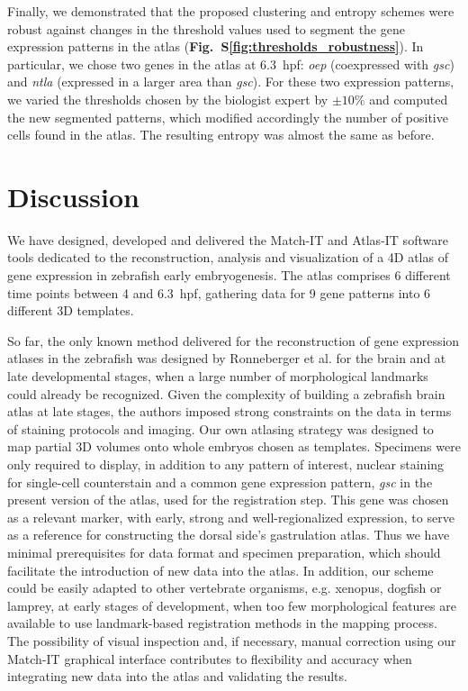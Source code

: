 Finally, we demonstrated that the proposed clustering and entropy schemes were robust against changes in the threshold values used to segment the gene expression patterns in the atlas (\textbf{Fig.~S\ref{fig:thresholds_robustness}}). In particular, we chose two genes in the atlas at 6.3~hpf: \emph{oep} (coexpressed with \emph{gsc}) and \emph{ntla} (expressed in a larger area than \emph{gsc}). For these two expression patterns, we varied the thresholds chosen by the biologist expert by $\pm10\%$ and computed the new segmented patterns, which modified accordingly the number of positive cells found in the atlas. The resulting entropy was almost the same as before.

\section*{Discussion}

We have designed, developed and delivered the Match-IT and Atlas-IT software tools dedicated to the reconstruction, analysis and visualization of a 4D atlas of gene expression in zebrafish early embryogenesis. The atlas comprises 6 different time points between 4 and 6.3~hpf, gathering data for 9 gene patterns into 6 different 3D templates.

So far, the only known method delivered for the reconstruction of gene expression atlases in the zebrafish was designed by Ronneberger et al.\cite{ronneberger2012vibe} for the brain and at late developmental stages, when a large number of morphological landmarks could already be recognized. Given the complexity of building a zebrafish brain atlas at late stages, the authors imposed strong constraints on the data in terms of staining protocols and imaging. Our own atlasing strategy was designed to map partial 3D volumes onto whole embryos chosen as templates.  Specimens were only required to display, in addition to any pattern of interest, nuclear staining for single-cell counterstain and a common gene expression pattern, \emph{gsc} in the present version of the atlas, used for the registration step. This gene was chosen as a relevant marker, with early, strong and well-regionalized expression, to serve as a reference for constructing the dorsal side's gastrulation atlas. Thus we have minimal prerequisites for data format and specimen preparation, which should facilitate the introduction of new data into the atlas. In addition, our scheme could be easily adapted to other vertebrate organisms, e.g. xenopus, dogfish or lamprey, at early stages of development, when too few morphological features are available to use landmark-based registration methods in the mapping process. The possibility of visual inspection and, if necessary, manual correction using our Match-IT graphical interface contributes to flexibility and accuracy when integrating new data into the atlas and validating the results.

